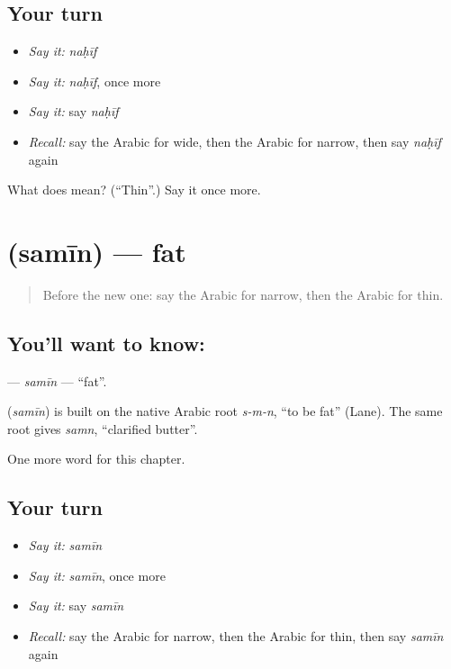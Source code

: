 \subsection*{Your turn}
\begin{itemize}
\raggedright
  \item \emph{Say it:} \emph{naḥīf}
  \item \emph{Say it:} \emph{naḥīf}, once more
  \item \emph{Say it:} say \emph{naḥīf}
  \item \emph{Recall:} say the Arabic for wide, then the Arabic for narrow, then say \emph{naḥīf} again
\end{itemize}

\begin{tcolorbox}[breakable,colback=teal!4,colframe=teal!35!black,title={Before you move on}]
What does  mean? (\textquotedblleft{}Thin\textquotedblright{}.) Say it once more.
\end{tcolorbox}
\section[\texorpdfstring{\ar{سمين} (samīn)}{سمين (samīn)}]{ (samīn) — fat}

\label{lesson:AR-C151-samin}



\begin{quote}
Before the new one: say the Arabic for narrow, then the Arabic for thin.
\end{quote}

\subsection*{You'll want to know: }
\textbf{} — \emph{samīn} — \textquotedblleft{}fat\textquotedblright{}.

\begin{cousinweb}
\textbf{} (\emph{samīn}) is built on the native Arabic root \emph{s-m-n}, \textquotedblleft{}to be fat\textquotedblright{} (Lane). The same root gives \emph{samn}, \textquotedblleft{}clarified butter\textquotedblright{}.
\end{cousinweb}

\begin{grammarlens}[title={What you've built}]
One more word for this chapter.
\end{grammarlens}

\subsection*{Your turn}
\begin{itemize}
\raggedright
  \item \emph{Say it:} \emph{samīn}
  \item \emph{Say it:} \emph{samīn}, once more
  \item \emph{Say it:} say \emph{samīn}
  \item \emph{Recall:} say the Arabic for narrow, then the Arabic for thin, then say \emph{samīn} again
\end{itemize}

